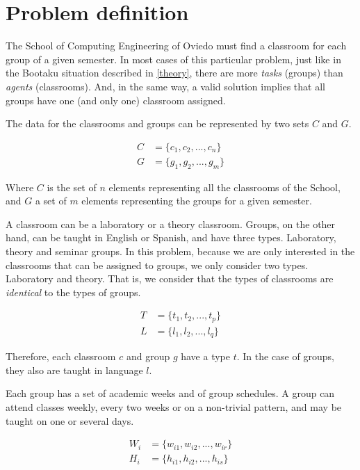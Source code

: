 \renewcommand{\documentname}{Problem definition}

\chapter{Problem definition}

The School of Computing Engineering of Oviedo must find a classroom for each group of a given semester. In most cases of this particular problem, just like in the Bootaku situation described in \ref{theory}, there are more \textit{tasks} (groups) than \textit{agents} (classrooms). And, in the same way, a valid solution implies that all groups have one (and only one) classroom assigned.

The data for the classrooms and groups can be represented by two sets $C$ and $G$. 

\begin{align}
    C &= \{ c_{1}, c_{2}, ..., c_{n} \}\\
    G &= \{ g_{1}, g_{2}, ..., g_{m} \}
\end{align}

Where $C$ is the set of $n$ elements representing all the classrooms of the School, and $G$ a set of $m$ elements representing the groups for a given semester.

A classroom can be a laboratory or a theory classroom. Groups, on the other hand, can be taught in English or Spanish, and have three types. Laboratory, theory and seminar groups. In this problem, because we are only interested in the classrooms that can be assigned to groups, we only consider two types. Laboratory and theory. That is, we consider that the types of classrooms are \textit{identical} to the types of groups.

\begin{align}
    T &= \{ t_{1}, t_{2}, ..., t_{p} \}\\
    L &= \{ l_{1}, l_{2}, ..., l_{q} \}
\end{align}

Therefore, each classroom $c$ and group $g$ have a type $t$. In the case of groups, they also are taught in language $l$.

Each group has a set of academic weeks and of group schedules. A group can attend classes weekly, every two weeks or on a non-trivial pattern, and may be taught on one or several days.

\begin{align}
    W_{i} &= \{ w_{i1}, w_{i2}, ..., w_{ir} \}\\
    H_{i} &= \{ h_{i1}, h_{i2}, ..., h_{is} \}
\end{align}

